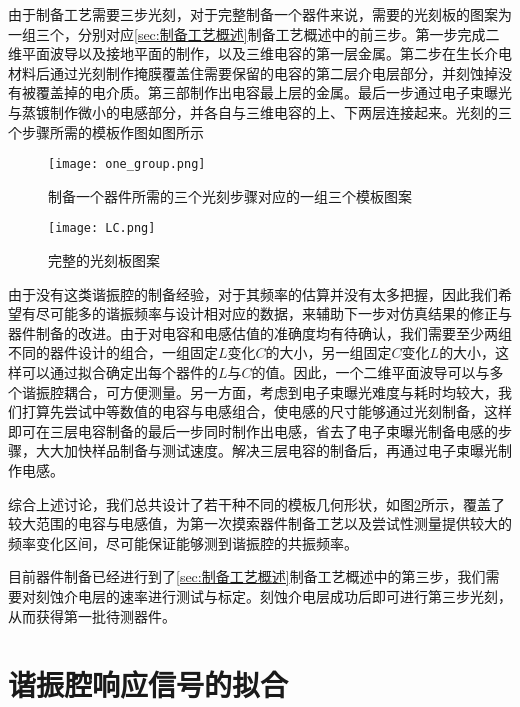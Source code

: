             由于制备工艺需要三步光刻，对于完整制备一个器件来说，需要的光刻板的图案为一组三个，分别对应\ref{sec:制备工艺概述}制备工艺概述中的前三步。第一步完成二维平面波导以及接地平面的制作，以及三维电容的第一层金属。第二步在生长介电材料后通过光刻制作掩膜覆盖住需要保留的电容的第二层介电层部分，并刻蚀掉没有被覆盖掉的电介质。第三部制作出电容最上层的金属。最后一步通过电子束曝光与蒸镀制作微小的电感部分，并各自与三维电容的上、下两层连接起来。光刻的三个步骤所需的模板作图如图所示
            

            \begin{figure}[h]
                \centering
                \texttt{[image: one\_group.png]}
                \caption{制备一个器件所需的三个光刻步骤对应的一组三个模板图案}
                \label{fig:one_group}
            \end{figure}

            \begin{figure}[h]
                \centering
                \texttt{[image: LC.png]}
                \caption{完整的光刻板图案}{}
                \label{fig:LC}
            \end{figure}

            由于没有这类谐振腔的制备经验，对于其频率的估算并没有太多把握，因此我们希望有尽可能多的谐振频率与设计相对应的数据，来辅助下一步对仿真结果的修正与器件制备的改进。由于对电容和电感估值的准确度均有待确认，我们需要至少两组不同的器件设计的组合，一组固定$L$变化$C$的大小，另一组固定$C$变化$L$的大小，这样可以通过拟合确定出每个器件的$L$与$C$的值。因此，一个二维平面波导可以与多个谐振腔耦合，可方便测量。另一方面，考虑到电子束曝光难度与耗时均较大，我们打算先尝试中等数值的电容与电感组合，使电感的尺寸能够通过光刻制备，这样即可在三层电容制备的最后一步同时制作出电感，省去了电子束曝光制备电感的步骤，大大加快样品制备与测试速度。解决三层电容的制备后，再通过电子束曝光制作电感。

            综合上述讨论，我们总共设计了若干种不同的模板几何形状，如图\ref{fig:LC}所示，覆盖了较大范围的电容与电感值，为第一次摸索器件制备工艺以及尝试性测量提供较大的频率变化区间，尽可能保证能够测到谐振腔的共振频率。

            目前器件制备已经进行到了\ref{sec:制备工艺概述}制备工艺概述中的第三步，我们需要对刻蚀介电层的速率进行测试与标定。刻蚀介电层成功后即可进行第三步光刻，从而获得第一批待测器件。
            



            \section{谐振腔响应信号的拟合} %
            \label{sec:谐振腔响应信号的拟合}
            	









